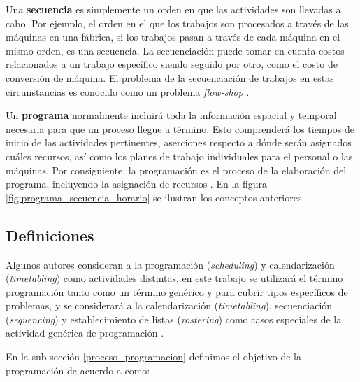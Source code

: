 \documentclass[draft,12pt,headsepline,footsepline,paper=letter]{scrreprt}
\begin{document}
Una \textbf{secuencia} es simplemente un orden en que las actividades son llevadas a cabo. Por ejemplo, el orden en el que los trabajos son procesados a través de las máquinas en una fábrica, si los trabajos pasan a través de cada máquina en el mismo orden, es una secuencia. La secuenciación puede tomar en cuenta costos relacionados a un trabajo específico siendo seguido por otro, como el costo de conversión de máquina. El problema de la secuenciación de trabajos en estas circunstancias es conocido como un problema \textit{flow-shop} \citep[p.~49]{wren95scheduling-timetabling}. 

Un \textbf{programa} normalmente incluirá toda la información espacial y temporal necesaria para que un proceso llegue a término. Esto comprenderá los tiempos de inicio de las actividades pertinentes, aserciones respecto a dónde serán asignados cuáles recursos, así como los planes de trabajo individuales para el personal o las máquinas.
%
Por consiguiente, la programación es el proceso de la elaboración del programa, incluyendo la asignación de recursos \citep[p.~49]{wren95scheduling-timetabling}.
%
En la figura \ref{fig:programa_secuencia_horario} se ilustran los conceptos anteriores.

\subsection{Definiciones}
\label{Definiciones}

Algunos autores consideran a la programación (\textit{scheduling}) y calendarización (\textit{timetabling}) como actividades distintas, en este trabajo se utilizará el término programación tanto como un término genérico y para cubrir tipos específicos de problemas, y se considerará a la calendarización (\textit{timetabling}), secuenciación (\textit{sequencing}) y establecimiento de listas (\textit{rostering}) como casos especiales de la actividad genérica de programación \citep[p.~47]{wren95scheduling-timetabling}.

En la sub-sección \ref{proceso_programacion} definimos el objetivo de la programación de acuerdo a \citet{wren95scheduling-timetabling} como:
\end{document}
